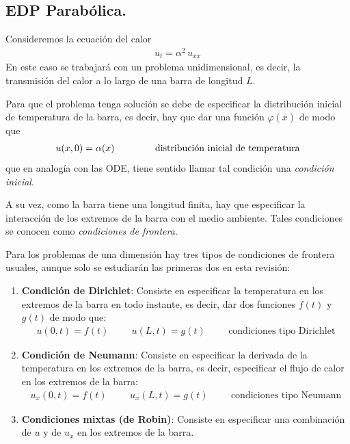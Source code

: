 \subsection{EDP Parabólica.}
Consideremos la ecuación del calor
\begin{align*}
u_{t} =  \alpha^{2} \,  u_{xx}
\end{align*}
En este caso se trabajará con un problema unidimensional, es decir, la transmisión del calor a lo largo de una barra de longitud $L$.
\par
Para que el problema tenga solución se debe de especificar la distribución inicial de temperatura de la barra, es decir, hay que dar una función $\varphi (x)$ de modo que
\begin{align}
u(x, 0) = \alpha (x) \hspace{1.5cm} \mbox{distribución inicial de temperatura}
\label{eq:ecuacion_06_02_02}
\end{align}
que en analogía con las ODE, tiene sentido llamar tal condición una \emph{condición inicial}.
\par
A su vez, como la barra tiene una longitud finita, hay que especificar la interacción de los extremos de la barra con el medio ambiente. Tales condiciones se conocen como \emph{condiciones de frontera}.
\par
Para los problemas de una dimensión hay tres tipos de condiciones de frontera usuales, aunque solo se estudiarán las primeras dos en esta revisión:
\begin{enumerate}
\item \textbf{Condición de Dirichlet}: Consiste en especificar la temperatura en los extremos de la barra en todo instante, es decir, dar dos funciones $f(t)$ y $g(t)$ de modo que:
\begin{align}
u(0, t) = f (t)  \hspace{1cm} u(L, t) = g(t) \hspace{1cm} \mbox{condiciones tipo Dirichlet}
\label{eq:ecuacion_06_02_03}    
\end{align}
\item \textbf{Condición de Neumann}: Consiste en especificar la derivada de la temperatura en los extremos de la barra, es decir, especificar el flujo de calor en los extremos de la barra:
\begin{align}
u_{x}(0,t) = f(t) \hspace{1cm} u_{x}(L,t) = g(t) \hspace{1cm} \mbox{condiciones tipo Neumann}
\label{eq:ecuacion_06_02_04}    
\end{align}
\item \textbf{Condiciones mixtas (de Robin)}: Consiste en especificar una combinación de $u$ y de $u_{x}$ en los extremos de la barra.
\end{enumerate}

